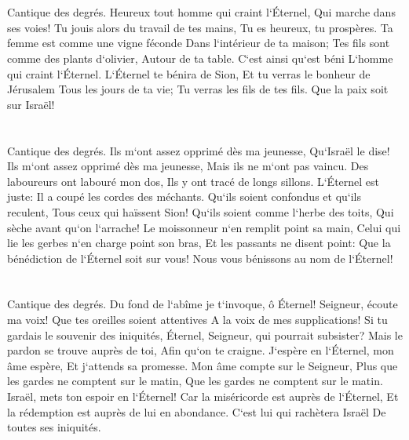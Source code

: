 \chapter{}

\verse Cantique des degrés. Heureux tout homme qui craint l`Éternel, Qui marche dans ses voies! 
\verse Tu jouis alors du travail de tes mains, Tu es heureux, tu prospères. 
\verse Ta femme est comme une vigne féconde Dans l`intérieur de ta maison; Tes fils sont comme des plants d`olivier, Autour de ta table. 
\verse C`est ainsi qu`est béni L`homme qui craint l`Éternel. 
\verse L`Éternel te bénira de Sion, Et tu verras le bonheur de Jérusalem Tous les jours de ta vie; 
\verse Tu verras les fils de tes fils. Que la paix soit sur Israël! 

\chapter{}

\verse Cantique des degrés. Ils m`ont assez opprimé dès ma jeunesse, Qu`Israël le dise! 
\verse Ils m`ont assez opprimé dès ma jeunesse, Mais ils ne m`ont pas vaincu. 
\verse Des laboureurs ont labouré mon dos, Ils y ont tracé de longs sillons. 
\verse L`Éternel est juste: Il a coupé les cordes des méchants. 
\verse Qu`ils soient confondus et qu`ils reculent, Tous ceux qui haïssent Sion! 
\verse Qu`ils soient comme l`herbe des toits, Qui sèche avant qu`on l`arrache! 
\verse Le moissonneur n`en remplit point sa main, Celui qui lie les gerbes n`en charge point son bras, 
\verse Et les passants ne disent point: Que la bénédiction de l`Éternel soit sur vous! Nous vous bénissons au nom de l`Éternel! 

\chapter{}

\verse Cantique des degrés. Du fond de l`abîme je t`invoque, ô Éternel! 
\verse Seigneur, écoute ma voix! Que tes oreilles soient attentives A la voix de mes supplications! 
\verse Si tu gardais le souvenir des iniquités, Éternel, Seigneur, qui pourrait subsister? 
\verse Mais le pardon se trouve auprès de toi, Afin qu`on te craigne. 
\verse J`espère en l`Éternel, mon âme espère, Et j`attends sa promesse. 
\verse Mon âme compte sur le Seigneur, Plus que les gardes ne comptent sur le matin, Que les gardes ne comptent sur le matin. 
\verse Israël, mets ton espoir en l`Éternel! Car la miséricorde est auprès de l`Éternel, Et la rédemption est auprès de lui en abondance. 
\verse C`est lui qui rachètera Israël De toutes ses iniquités. 

